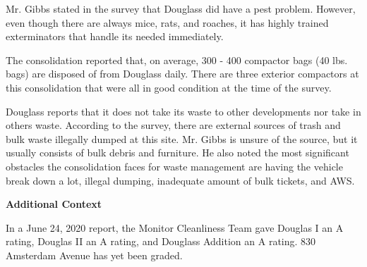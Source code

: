 Mr. Gibbs stated in the survey that Douglass did have a pest problem. However, even though there are always mice, rats, and roaches, it has highly trained exterminators that handle its needed immediately.

The consolidation reported that, on average,  300  - 400 compactor bags (40 lbs. bags) are disposed of from Douglass daily. There are three exterior compactors at this consolidation that were all in good condition at the time of the survey. 

Douglass reports that it does not take its waste to other developments nor take in others waste. According to the survey, there are external sources of trash and bulk waste illegally dumped at this site.  Mr. Gibbs is unsure of the source, but it usually consists of bulk debris and furniture. He also noted the most significant obstacles the consolidation faces for waste management are having the vehicle break down a lot, illegal dumping, inadequate amount of bulk tickets, and AWS.  

\textbf{Additional Context} 

In a June 24, 2020 report, the Monitor Cleanliness Team gave Douglas I an A rating, Douglas II an A rating, and Douglass Addition an A rating. 830 Amsterdam Avenue has yet been graded.